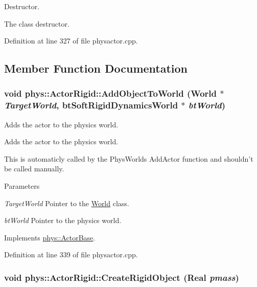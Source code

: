 Destructor. 

The class destructor. 

Definition at line 327 of file physactor.cpp.



\subsection{Member Function Documentation}
\hypertarget{classphys_1_1ActorRigid_a3c56eb06fe6a7d468b7a67c45ade7be4}{
\subsubsection[{AddObjectToWorld}]{\setlength{\rightskip}{0pt plus 5cm}void phys::ActorRigid::AddObjectToWorld ({\bf World} $\ast$ {\em TargetWorld}, \/  btSoftRigidDynamicsWorld $\ast$ {\em btWorld})}}
\label{d8/d71/classphys_1_1ActorRigid_a3c56eb06fe6a7d468b7a67c45ade7be4}


Adds the actor to the physics world. 

Adds the actor to the physics world. \par
 This is automaticly called by the PhysWorlds AddActor function and shouldn't be called manually. 
\begin{DoxyParams}{Parameters}
\item[{\em TargetWorld}]Pointer to the \hyperlink{classphys_1_1World}{World} class. \item[{\em btWorld}]Pointer to the physics world. \end{DoxyParams}


Implements \hyperlink{classphys_1_1ActorBase_ac5d4ad5a634b16000742f506ed5957fb}{phys::ActorBase}.



Definition at line 339 of file physactor.cpp.

\hypertarget{classphys_1_1ActorRigid_a19227c52b972cd96ad69a7b6273e2bbf}{
\subsubsection[{CreateRigidObject}]{\setlength{\rightskip}{0pt plus 5cm}void phys::ActorRigid::CreateRigidObject ({\bf Real} {\em pmass})}}
\label{d8/d71/classphys_1_1ActorRigid_a19227c52b972cd96ad69a7b6273e2bbf}



